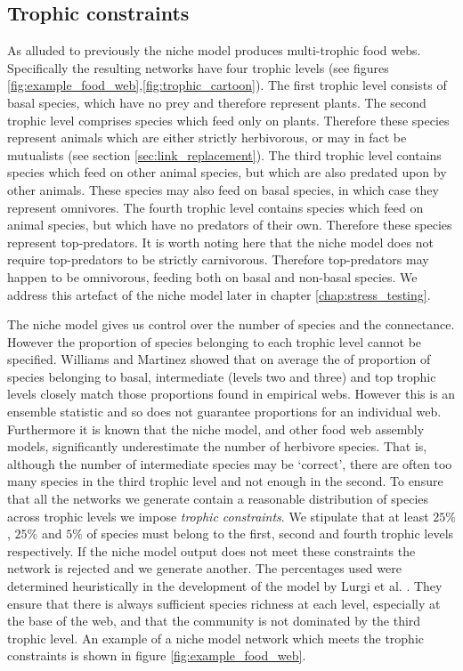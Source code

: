 \subsection{Trophic constraints}
\label{sec:trophic_constraints}

As alluded to previously the niche model produces multi-trophic food webs. Specifically the resulting networks have four trophic levels (see figures \ref{fig:example_food_web},\ref{fig:trophic_cartoon}). The first trophic level consists of basal species, which have no prey and therefore represent plants. The second trophic level comprises species which feed only on plants. Therefore these species represent animals which are either strictly herbivorous, or may in fact be mutualists (see section \ref{sec:link_replacement}). The third trophic level contains species which feed on other animal species, but which are also predated upon by other animals. These species may also feed on basal species, in which case they represent omnivores. The fourth trophic level contains species which feed on animal species, but which have no predators of their own. Therefore these species represent top-predators. It is worth noting here that the niche model does not require top-predators to be strictly carnivorous. Therefore top-predators may happen to be omnivorous, feeding both on basal and non-basal species. We address this artefact of the niche model later in chapter \ref{chap:stress_testing}.

The niche model gives us control over the number of species and the connectance. However the proportion of species belonging to each trophic level cannot be specified. Williams and Martinez \cite{williams2000simple} showed that on average the of proportion of species belonging to basal, intermediate (levels two and three) and top trophic levels closely match those proportions found in empirical webs. However this is an ensemble statistic and so does not guarantee proportions for an individual web. Furthermore it is known that the niche model, and other food web assembly models, significantly underestimate the number of herbivore species\cite{williams2008success}. That is, although the number of intermediate species may be `correct', there are often too many species in the third trophic level and not enough in the second. To ensure that all the networks we generate contain a reasonable distribution of species across trophic levels we impose \emph{trophic constraints}. We stipulate that at least $25\%$, $25\%$ and $5\%$ of species must belong to the first, second and fourth trophic levels respectively. If the niche model output does not meet these constraints the network is rejected and we generate another. The percentages used were determined heuristically in the development of the model by Lurgi et al. \cite{lurgi2015effects}. They ensure that there is always sufficient species richness at each level, especially at the base of the web, and that the community is not dominated by the third trophic level. An example of a niche model network which meets the trophic constraints is shown in figure \ref{fig:example_food_web}.

